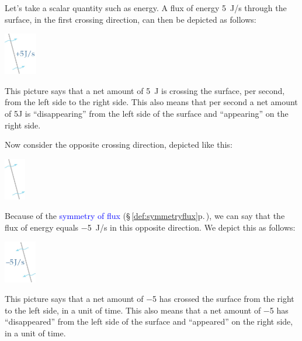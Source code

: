 \documentclass[a4paper,12pt,%
onecolumn,oneside,%
british%
]{memoir}
\renewcommand*{\|}[1][]{\nonscript\:#1\vert\nonscript\:\mathopen{}}
\newcommand*{\sect}{\S}%
\renewcommand*{\autoref}[3][\sect\,\ref]{\textcolor{blue}{#3} {\color{blue}\scriptsize(\faIcon[regular]{eye}\;#1{#2}\;p.\,\pageref{#2})}}
\begin{document}
Let's take a scalar quantity such as energy. A flux of energy \qty{+5}{J/s} through the surface, in the first crossing direction, can then be depicted as follows:\noprelistbreak
\begin{center}
  \medskip
  \includegraphics[height=5em]{images/flux_plus5J.jpg}
\end{center}
This picture says that a net amount of \qty{5}{J} is crossing the surface, per second, from the left side to the right side. This also means that per second a net amount of \num{5}{J} is \enquote{disappearing} from the left side of the surface and \enquote{appearing} on the right side.

\medskip

Now consider the opposite crossing direction, depicted like this:\noprelistbreak
\begin{center}
  \medskip
  \includegraphics[height=5em]{images/inv_surface_tilted_crossing.jpg}
\end{center}
Because of the \autoref{def:symmetryflux}{symmetry of flux}, we can say that the flux of energy equals \qty{-5}{J/s} in this opposite direction. We depict this as follows:\noprelistbreak
\begin{center}
  \medskip
  \includegraphics[height=5em]{images/inv_flux_plus5J.jpg}
\end{center}
This picture says that a net amount of \num{-5} has crossed the surface from the right to the left side, in a unit of time. This also means that a net amount of \num{-5} has \enquote{disappeared} from the left side of the surface and \enquote{appeared} on the right side, in a unit of time.
\end{document}
